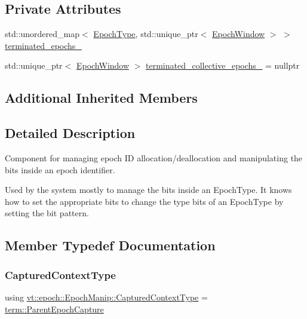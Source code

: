 \subsection*{Private Attributes}
\begin{DoxyCompactItemize}
\item 
std\+::unordered\+\_\+map$<$ \hyperlink{namespacevt_a985a5adf291c34a3ca263b3378388236}{Epoch\+Type}, std\+::unique\+\_\+ptr$<$ \hyperlink{structvt_1_1epoch_1_1_epoch_window}{Epoch\+Window} $>$ $>$ \hyperlink{structvt_1_1epoch_1_1_epoch_manip_aae06cc3b0a36114406ff318045d1c3fa}{terminated\+\_\+epochs\+\_\+}
\item 
std\+::unique\+\_\+ptr$<$ \hyperlink{structvt_1_1epoch_1_1_epoch_window}{Epoch\+Window} $>$ \hyperlink{structvt_1_1epoch_1_1_epoch_manip_aa686e6a82ce06391ff223eb8ccd9fb7a}{terminated\+\_\+collective\+\_\+epochs\+\_\+} = nullptr
\end{DoxyCompactItemize}
\subsection*{Additional Inherited Members}


\subsection{Detailed Description}
Component for managing epoch ID allocation/deallocation and manipulating the bits inside an epoch identifier. 

Used by the system mostly to manage the bits inside an {\ttfamily Epoch\+Type}. It knows how to set the appropriate bits to change the type bits of an {\ttfamily Epoch\+Type} by setting the bit pattern. 

\subsection{Member Typedef Documentation}
\mbox{\label{structvt_1_1epoch_1_1_epoch_manip_ab1fe66501b6b83b07fd4188fc6a8a4fe}} 
\subsubsection{\texorpdfstring{Captured\+Context\+Type}{CapturedContextType}}
{\footnotesize\ttfamily using \hyperlink{structvt_1_1epoch_1_1_epoch_manip_ab1fe66501b6b83b07fd4188fc6a8a4fe}{vt\+::epoch\+::\+Epoch\+Manip\+::\+Captured\+Context\+Type} =  \hyperlink{structvt_1_1term_1_1_parent_epoch_capture}{term\+::\+Parent\+Epoch\+Capture}}




